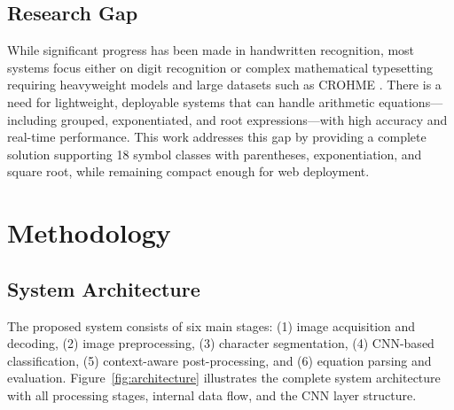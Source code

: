 \documentclass[conference]{IEEEtran}
\begin{document}
\subsection{Research Gap}

While significant progress has been made in handwritten recognition, most systems focus either on digit recognition or complex mathematical typesetting requiring heavyweight models and large datasets such as CROHME \cite{mouchere2016icfhr2016}. There is a need for lightweight, deployable systems that can handle arithmetic equations---including grouped, exponentiated, and root expressions---with high accuracy and real-time performance. This work addresses this gap by providing a complete solution supporting 18 symbol classes with parentheses, exponentiation, and square root, while remaining compact enough for web deployment.

\section{Methodology}

\subsection{System Architecture}

The proposed system consists of six main stages: (1) image acquisition and decoding, (2) image preprocessing, (3) character segmentation, (4) CNN-based classification, (5) context-aware post-processing, and (6) equation parsing and evaluation. Figure~\ref{fig:architecture} illustrates the complete system architecture with all processing stages, internal data flow, and the CNN layer structure.
\end{document}
